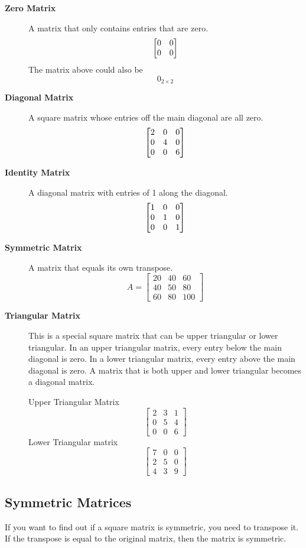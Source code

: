 \begin{description}
	\item[\textbf{Zero Matrix}] A matrix that only contains entries that are zero. $$\begin{bmatrix} 0 & 0 \\ 0 & 0 \end{bmatrix}$$ The matrix above could also be $$0_{2\times 2}$$
       \item[\textbf{Diagonal Matrix}] A square matrix whose entries off the main diagonal are all zero. $$\begin{bmatrix} 2 & 0 & 0 \\ 0 & 4 & 0 \\ 0 & 0 & 6 \end{bmatrix}$$
	\item[\textbf{Identity Matrix}] A diagonal matrix with entries of 1 along the diagonal. $$\begin{bmatrix} 1 & 0 & 0 \\ 0 & 1 & 0 \\ 0 & 0 & 1 \end{bmatrix}$$
	\item[\textbf{Symmetric Matrix}] A matrix that equals its own transpose.
	$$
       A = \begin{bmatrix}
       20 & 40 & 60 \\
       40 & 50 & 80 \\
       60 & 80 & 100
       \end{bmatrix}
       $$
	\item[\textbf{Triangular Matrix}] This is a special square matrix that can be upper triangular or lower triangular. In an upper triangular matrix, every entry below the main diagonal is zero. In a lower triangular matrix, every entry above the main diagonal is zero. A matrix that is both upper and lower triangular becomes a diagonal matrix.
	
       Upper Triangular Matrix
       $$
       \begin{bmatrix}
       2 & 3 & 1 \\
       0 & 5 & 4 \\
       0 & 0 & 6
       \end{bmatrix}
       $$
       Lower Triangular matrix
       $$
       \begin{bmatrix}
       7 & 0 & 0 \\
       2 & 5 & 0 \\
       4 & 3 & 9
       \end{bmatrix}
       $$
\end{description}

\subsection{Symmetric Matrices}
If you want to find out if a square matrix is symmetric, you need to transpose it. If the transpose is equal to the original matrix, then the matrix is symmetric.

